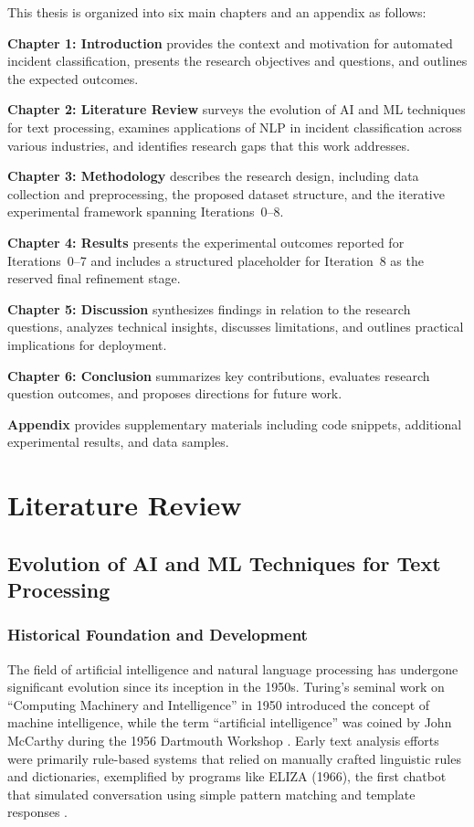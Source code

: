 \documentclass[11pt, titlepage, bibliography=totoc]{scrreprt}
\begin{document}
This thesis is organized into six main chapters and an appendix as follows:

\textbf{Chapter 1: Introduction} provides the context and motivation for automated incident classification, presents the research objectives and questions, and outlines the expected outcomes.

\textbf{Chapter 2: Literature Review} surveys the evolution of AI and ML techniques for text processing, examines applications of NLP in incident classification across various industries, and identifies research gaps that this work addresses.

\textbf{Chapter 3: Methodology} describes the research design, including data collection and preprocessing, the proposed dataset structure, and the iterative experimental framework spanning Iterations~0--8.

\textbf{Chapter 4: Results} presents the experimental outcomes reported for Iterations~0--7 and includes a structured placeholder for Iteration~8 as the reserved final refinement stage.

\textbf{Chapter 5: Discussion} synthesizes findings in relation to the research questions, analyzes technical insights, discusses limitations, and outlines practical implications for deployment.

\textbf{Chapter 6: Conclusion} summarizes key contributions, evaluates research question outcomes, and proposes directions for future work.

\textbf{Appendix} provides supplementary materials including code snippets, additional experimental results, and data samples.

\newpage



\chapter{Literature Review}

\section{Evolution of AI and ML Techniques for Text Processing}

\subsection{Historical Foundation and Development}
The field of artificial intelligence and natural language processing has undergone significant evolution since its inception in the 1950s. Turing's seminal work on ``Computing Machinery and Intelligence'' in 1950 introduced the concept of machine intelligence, while the term ``artificial intelligence'' was coined by John McCarthy during the 1956 Dartmouth Workshop \cite{mccarthy1955}. Early text analysis efforts were primarily rule-based systems that relied on manually crafted linguistic rules and dictionaries, exemplified by programs like \textsc{ELIZA} (1966), the first chatbot that simulated conversation using simple pattern matching and template responses \cite{weizenbaum1966}.
\end{document}
